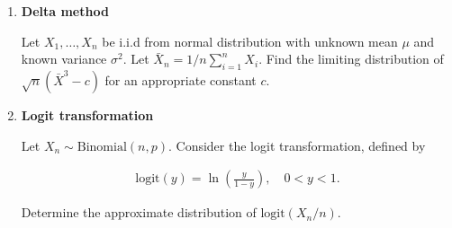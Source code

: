 
\begin{exercise}

\phantom{}

\begin{enumerate}[label = (\alph*)]
  \item \textbf{Delta method}

  Let $X_1,\dots,X_n$ be i.i.d from normal distribution with unknown mean $\mu$
  and known variance $\sigma^2$. Let $\bar{X}_n = 1/n\sum_{i=1}^n X_i$.
  Find the limiting distribution of $\sqrt{n}\left(\bar{X}^3 -c\right)$ for an
  appropriate constant $c$.

  \item \textbf{Logit transformation}

  Let $X_n \sim \mathrm{Binomial}(n,p)$. Consider the logit transformation, defined by

  \begin{align*}
    \mathrm{logit}(y) = \ln\left(\frac{y}{1-y}\right), \quad 0 < y < 1.
  \end{align*}

  Determine the approximate distribution of $\mathrm{logit}(X_n/n)$.
\end{enumerate}

\end{exercise}


